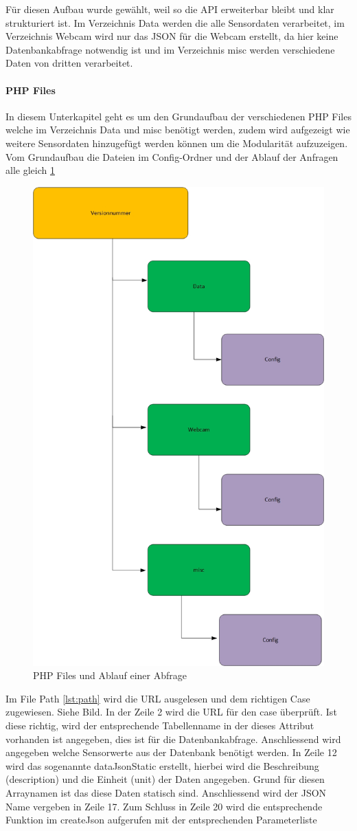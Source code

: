Für diesen Aufbau wurde gewählt, weil so die API erweiterbar bleibt und klar strukturiert ist. Im Verzeichnis Data werden die alle Sensordaten verarbeitet, im Verzeichnis Webcam wird nur das JSON für die Webcam erstellt, da hier keine Datenbankabfrage notwendig ist und im Verzeichnis misc werden verschiedene Daten von dritten verarbeitet.

\paragraph{PHP Files}
In diesem Unterkapitel geht es um den Grundaufbau der verschiedenen PHP Files welche im Verzeichnis Data und misc benötigt werden, zudem wird aufgezeigt wie weitere Sensordaten hinzugefügt werden können um die Modularität aufzuzeigen. Vom Grundaufbau die Dateien im Config-Ordner und der Ablauf der Anfragen alle gleich \ref{img:APIFiles}
\begin{figure}[h!]
	\centering
	\includegraphics[width=0.5\linewidth]{img/APIFiles.jpg}
	\caption{PHP Files und Ablauf einer Abfrage}
	\label{img:APIFiles}
\end{figure}


Im File Path \ref{lst:path} wird die URL ausgelesen und dem richtigen Case zugewiesen. Siehe Bild. In der Zeile 2 wird die URL für den case überprüft. Ist diese richtig, wird der entsprechende Tabellenname in der dieses Attribut vorhanden ist angegeben, dies ist für die Datenbankabfrage. Anschliessend wird angegeben welche Sensorwerte aus der Datenbank benötigt werden. In Zeile 12 wird das sogenannte dataJsonStatic erstellt, hierbei wird die Beschreibung (description) und die Einheit (unit) der Daten angegeben. Grund für diesen Arraynamen ist das diese Daten statisch sind. Anschliessend wird der JSON Name vergeben in Zeile 17. Zum Schluss in Zeile 20 wird die entsprechende Funktion im createJson aufgerufen mit der entsprechenden Parameterliste


